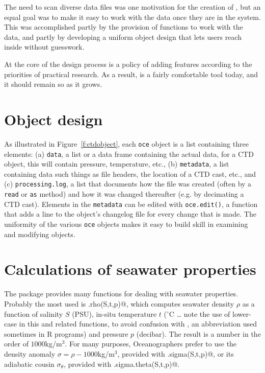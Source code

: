 \documentclass{article}
\begin{document}
The need to scan diverse data files was one motivation for the creation of
\verb@oce@, but an equal goal was to make it easy to work with the data once
they are in the system.  This was accomplished partly by the provision of
functions to work with the data, and partly by developing a uniform object
design that lets users reach inside without guesswork. 

At the core of the \verb@oce@ design process is a policy of adding features
according to the priorities of practical research. As a result, \verb@oce@ is a
fairly comfortable tool today, and it should remain so as it grows.


\section{Object design}

As illustrated in Figure~\ref{f:ctdobject}, each \texttt{oce} object is a list
containing three elements: (a) \texttt{data}, a list or a data frame containing
the actual data, for a CTD object, this will contain pressure, temperature,
etc., (b) \texttt{metadata}, a list containing data such things as file headers,
the location of a CTD cast, etc., and (c) \texttt{processing.log}, a list that
documents how the file was created (often by a \texttt{read} or \texttt{as}
method) and how it was changed thereafter (e.g. by decimating a CTD cast).
Elements in the \texttt{metadata} can be edited with
\texttt{oce.edit()}, a function that adds a line to the object's changelog file
for every change that is made.  The uniformity of the various \texttt{oce}
objects makes it easy to build skill in examining and modifying objects.



\section{Calculations of seawater properties}


The \verb@oce@ package provides many functions for dealing with seawater
properties. Probably the most used is \verb@sw.rho(S,t,p)@, which computes
seawater density $\rho$ as a function of salinity $S$ (PSU), in-situ temperature
$t$ ($^\circ$C \dots\/ note the use of lower-case in this and related functions,
to avoid confusion with \verb@T@, an abbreviation used sometimes in R programs)
and pressure $p$ (decibar). The result is a number in the order of
$1000$kg/m$^3$.  For many purposes, Oceanographers prefer to use the density
anomaly $\sigma=\rho-1000$kg/m$^3$, provided with \verb@sw.sigma(S,t,p)@, or its
adiabatic cousin $\sigma_\theta$, provided with \verb@sw.sigma.theta(S,t,p)@.
\end{document}
